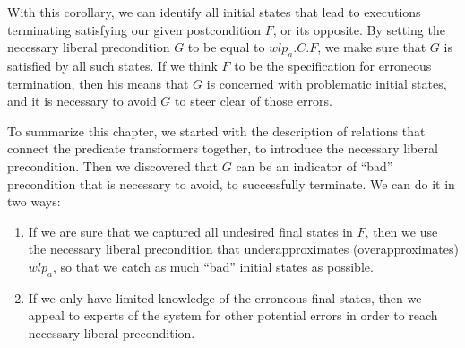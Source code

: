 With this corollary, we can identify all initial states that lead to executions terminating satisfying our given postcondition $F$, or its opposite. 
By setting the necessary liberal precondition $G$ to be equal to $wlp_a.C.F$, we make sure that $G$ is satisfied by all such states. 
If we think $F$ to be the specification for erroneous termination, then his means that $G$ is concerned with  problematic initial states, and it is necessary to avoid $G$ to steer clear of those errors. 

To summarize this chapter, we started with the description of relations that connect the predicate transformers together, to introduce the necessary liberal precondition. 
Then we discovered that $G$ can be an indicator of ``bad'' precondition that is necessary to avoid, to successfully terminate. 
We can do it in two ways: 
\begin{enumerate}
	\item If we are sure that we captured all undesired final states in $F$, then we use the necessary liberal precondition that underapproximates (overapproximates) $wlp_a$, so that we catch as much ``bad'' initial states as possible. 
	\item If we only have limited knowledge of the erroneous final states, then we appeal to experts of the system for other potential errors in order to reach necessary liberal precondition. 
\end{enumerate}



